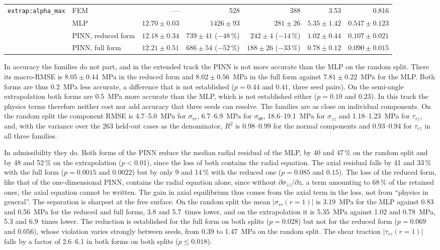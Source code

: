 \documentclass[pdflatex,sn-basic,Numbered]{sn-jnl}
\begin{document}
\begin{table}
\begin{tabular}{@{}llrrrrr@{}}
\addlinespace
\texttt{extrap:alpha\_max} & FEM                & ---            & 528 & 388 & 3.53 & 0.816 \\
                           & MLP                & $12.70\pm0.03$ & $1426\pm93$ & $281\pm26$ & $5.35\pm1.42$ & $0.547\pm0.123$ \\
                           & PINN, reduced form & $12.18\pm0.34$ & $739\pm41$ ($-48\,\%$) & $242\pm4$ ($-14\,\%$) & $1.02\pm0.44$ & $0.107\pm0.021$ \\
                           & PINN, full form    & $12.21\pm0.51$ & $686\pm54$ ($-52\,\%$) & $188\pm26$ ($-33\,\%$) & $0.78\pm0.12$ & $0.090\pm0.015$ \\
\bottomrule
\end{tabular}
\end{table}
In accuracy the families do not part, and in the extended track the PINN is not more accurate than the MLP on the random split. There its macro-RMSE is $8.05\pm0.44$~MPa in the reduced form and $8.02\pm0.56$~MPa in the full form against $7.81\pm0.22$~MPa for the MLP. Both forms are thus 0.2~MPa less accurate, a difference that is not established ($p=0.44$ and $0.41$, three seed pairs). On the semi-angle extrapolation both forms are 0.5~MPa more accurate than the MLP, which is not established either ($p=0.10$ and $0.23$). In this track the physics terms therefore neither cost nor add accuracy that three seeds can resolve. The families are as close on individual components. On the random split the component RMSE is 4.7--5.0~MPa for $\sigma_{rr}$, 6.7--6.9~MPa for $\sigma_{\theta\theta}$, 18.6--19.1~MPa for $\sigma_{zz}$ and 1.18--1.23~MPa for $\tau_{rz}$, and, with the variance over the 263 held-out cases as the denominator, $R^2$ is 0.98--0.99 for the normal components and 0.93--0.94 for $\tau_{rz}$ in all three families.

In admissibility they do. Both forms of the PINN reduce the median radial residual of the MLP, by 40 and 47\,\% on the random split and by 48 and 52\,\% on the extrapolation ($p<0.01$), since the loss of both contains the radial equation. The axial residual falls by 41 and 33\,\% with the full form ($p=0.0015$ and $0.0022$) but by only 9 and 14\,\% with the reduced one ($p=0.085$ and $0.15$). The loss of the reduced form, like that of the one-dimensional PINN, contains the radial equation alone, since without $\partial\sigma_{zz}/\partial z$, a term amounting to 68\,\% of the retained ones, the axial equation cannot be written. The gain in axial equilibrium thus comes from the axial term in the loss, not from ``physics in general''. The separation is sharpest at the free surface. On the random split the mean $|\sigma_{rr}(r{=}1)|$ is 3.19~MPa for the MLP against 0.83 and 0.56~MPa for the reduced and full forms, 3.8 and 5.7~times lower, and on the extrapolation it is 5.35~MPa against 1.02 and 0.78~MPa, 5.3 and 6.9~times lower. The reduction is established for the full form on both splits ($p=0.028$) but not for the reduced form ($p=0.069$ and $0.056$), whose violation varies strongly between seeds, from 0.39 to 1.47~MPa on the random split. The shear traction $|\tau_{rz}(r{=}1)|$ falls by a factor of 2.6--6.1 in both forms on both splits ($p\le0.018$).
\end{document}
